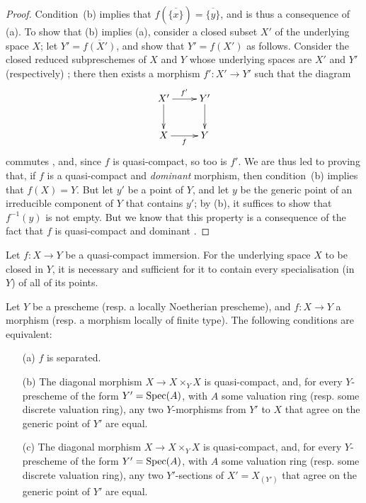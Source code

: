 \begin{proof}
\label{proof-II.7.2.1}
Condition~(b) implies that $f(\overline{\{x\}})=\overline{\{y\}}$, and is thus a consequence of (a).
To show that (b) implies (a), consider a closed subset $X'$ of the underlying space $X$;
let $Y'=\overline{f(X')}$, and show that $Y'=f(X')$ as follows.
Consider the closed reduced subpreschemes of $X$ and $Y$ whose underlying spaces are $X'$ and $Y'$ (respectively) ;
there then exists a morphism $f':X'\to Y'$ such that the diagram
\[
    \xymatrix{
        X' \ar[r]^{f'} \ar[d]
        & Y' \ar[d]
    \\  X \ar[r]_{f}
        & Y
    }
\]
commutes , and, since $f$ is quasi-compact, so too is $f'$.
We are thus led to proving that, if $f$ is a quasi-compact and \emph{dominant} morphism, then
condition~(b) implies that $f(X)=Y$.
But let $y'$ be a point of $Y$, and let $y$ be the generic point of an irreducible component of $Y$ that contains $y'$;
by (b), it suffices to show that $f^{-1}(y)$ is not empty.
But we know that this property is a consequence of the fact that $f$ is quasi-compact and dominant .
\end{proof}

\begin{corollary}[7.2.2]
\label{II.7.2.2}
Let $f:X\to Y$ be a quasi-compact immersion.
For the underlying space $X$ to be closed in $Y$, it is necessary and sufficient for it to contain every specialisation (in $Y$) of all of its points.
\end{corollary}

\begin{proposition}[7.2.3]
\label{II.7.2.3}
Let $Y$ be a prescheme (resp. a locally Noetherian prescheme), and $f:X\to Y$ a morphism (resp. a morphism locally of finite type).
The following conditions are equivalent:
\begin{enumerate}
    \item[\rm{(a)}] $f$ is separated.
    \item[\rm{(b)}] The diagonal morphism $X\to X\times_Y X$ is quasi-compact, and, for every $Y$-prescheme of the form $Y'=\operatorname{Spec}(A)$, with $A$ some valuation ring (resp. some discrete valuation ring), any two $Y$-morphisms from $Y'$ to $X$ that agree on the generic point of $Y'$ are equal.
    \item[\rm{(c)}] The diagonal morphism $X\to X\times_Y X$ is quasi-compact, and, for every $Y$-prescheme of the form $Y'=\operatorname{Spec}(A)$, with $A$ some valuation ring (resp. some discrete valuation ring), any two $Y'$-sections of $X'=X_{(Y')}$ that agree on the generic point of $Y'$ are equal.
\end{enumerate}
\end{proposition}

